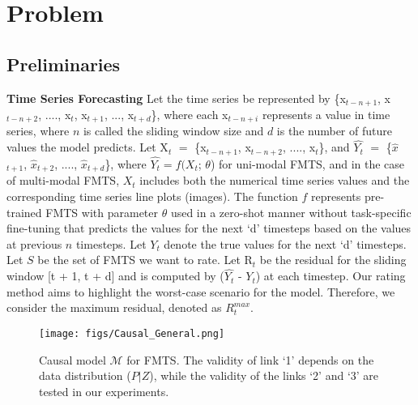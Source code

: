 \section{Problem}
\label{sec:problem}
\subsection{Preliminaries}
\noindent \textbf{Time Series Forecasting}
Let the time series be represented by \{x$_{t-n+1}$, x$_{t-n+2}$, ...., x$_{t}$, x$_{t+1}$, ..., x$_{t+d}$\}, where each x$_{t-n+i}$ represents a value in time series, 
where $n$ is called the sliding window size and $d$ is the number of future values the model predicts. Let X$_{t}$ $=$ \{x$_{t-n+1}$, x$_{t-n+2}$, ...., x$_{t}$\}, and $\hat{Y_{t}}$ $=$ \{$\hat{x}$$_{t+1}$, $\hat{x}$$_{t+2}$, ...., $\hat{x}$$_{t+d}$\}, where $\hat{Y_{t}}=f(X_t$; $\theta$) for uni-modal FMTS, and in the case of multi-modal FMTS, $X_t$ includes both the numerical time series values and the corresponding time series line plots (images). The function $f$ represents pre-trained FMTS with parameter $\theta$ used in a zero-shot manner without task-specific fine-tuning that predicts the values for the next `d' timesteps based on the values at previous $n$ timesteps. Let $Y_{t}$ denote the true values for the next `d' timesteps. Let $S$ be the set of FMTS we want to rate. Let R$_{t}$ be the residual for the sliding window [t + 1, t + d] and is computed by ($\hat{Y_{t}}$ - $Y_{t}$) at each timestep.
Our rating method aims to highlight the worst-case scenario for the model. Therefore, we consider the maximum residual, denoted as $R^{max}_{t}$.
\vspace{-1em}

\begin{figure}[!h]
    \centering
    \texttt{[image: figs/Causal\_General.png]}
    \caption{Causal model $\mathcal{M}$ for FMTS. The validity of link `1' depends on the data distribution ($P|Z$), while the validity of the links `2' and `3' are tested in our experiments.}
   \label{fig:causal-model}
   \vspace{-2.2em}
\end{figure}

